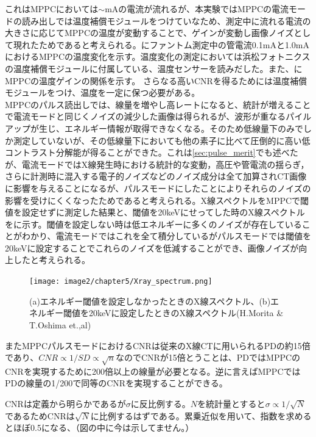 これはMPPCにおいては$\sim$mAの電流が流れるが、本実験ではMPPCの電流モードの読み出しでは温度補償モジュールをつけていなため、測定中に流れる電流の大きさに応じてMPPCの温度が変動することで、ゲインが変動し画像ノイズとして現れたためであると考えられる。にファントム測定中の管電流0.1mAと1.0mAにおけるMPPCの温度変化を示す。温度変化の測定においては浜松フォトニクスの温度補償モジュールに付属している、温度センサーを読みだした。また、にMPPCの温度ゲインの関係を示す。
さらなる高いCNRを得るためには温度補償モジュールをつけ、温度を一定に保つ必要がある。\\
MPPCのパルス読出しでは、線量を増やし高レートになると、統計が増えることで電流モードと同じくノイズの減少した画像は得られるが、波形が重なるパイルアップが生じ、エネルギー情報が取得できなくなる。そのため低線量下のみでしか測定していないが、その低線量下においても他の素子に比べて圧倒的に高い低コントラスト分解能が得ることができた。これは\ref{sec:pulse_merit}でも述べたが、電流モードではX線発生時における統計的な変動，高圧や管電流の揺らぎ，さらに計測時に混入する電子的ノイズなどのノイズ成分は全て加算されCT画像に影響を与えることになるが、パルスモードにしたことによりそれらのノイズの影響を受けにくくなったためであると考えられる。X線スペクトルをMPPCで閾値を設定せずに測定した結果と、閾値を20keVにせってした時のX線スペクトルをに示す。閾値を設定しない時は低エネルギーに多くのノイズが存在していることがわかり、電流モードではこれを全て積分しているがパルスモードでは閾値を20keVに設定することでこれらのノイズを低減することができ、画像ノイズが向上したと考えられる。

\begin{figure}[H]
 \begin{center}
 \texttt{[image: image2/chapter5/Xray\_spectrum.png]} 
 \end{center}
 \caption{(a)エネルギー閾値を設定しなかったときのX線スペクトル、(b)エネルギー閾値を20keVに設定したときのX線スペクトル(H.Morita \& T.Oshima et.,al)}
 \label{fig:Xray_spectrum}
\end{figure}

\fi


またMPPCパルスモードにおけるCNRは従来のX線CTに用いられるPDの約15倍であり、$CNR\propto 1/SD\propto\sqrt{n} $なのでCNRが15倍とうことは、PDではMPPCのCNRを実現するために200倍以上の線量が必要となる。逆に言えばMPPCではPDの線量の1/200で同等のCNRを実現することができる。

CNRは定義から明らかであるが$\sigma$に反比例する。$N$を統計量とすると$\sigma\propto1/\sqrt{N}$であるためCNRは$\sqrt{N}$に比例するはずである。累乗近似を用いて、指数を求めるとほぼ0.5になる、（図の中に今は示してません。）
\fi

